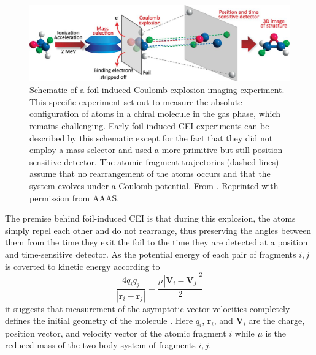 \begin{figure}[H]
  \centering
  \includegraphics[width=\textwidth]{gfx/FoilExperiment}
  \caption[Schematic of a foil-induced Coulomb explosion imaging experiment.]
  {Schematic of a foil-induced Coulomb explosion imaging experiment. This specific experiment set out to measure the absolute configuration of atoms in a chiral molecule in the gas phase, which remains challenging. Early foil-induced CEI experiments can be described by this schematic except for the fact that they did not employ a mass selector and used a more primitive but still position-sensitive detector. The atomic fragment trajectories (dashed lines) assume that no rearrangement of the atoms occurs and that the system evolves under a Coulomb potential. From \citet{Herwig13}. Reprinted with permission from AAAS.}
  \label{fig:foilExperiment}
\end{figure}

The premise behind foil-induced CEI is that during this explosion, the atoms simply repel each other and do not rearrange, thus preserving the angles between them from the time they exit the foil to the time they are detected at a position and time-sensitive detector. As the potential energy of each pair of fragments $i,j$ is coverted to kinetic energy according to
\begin{equation}\label{eq:foilCEI}
\frac{4q_i q_j}{|\mathbf{r}_i - \mathbf{r}_j|} = \frac{\mu|\mathbf{V}_i - \mathbf{V}_j|^2}{2}
\end{equation}
it suggests that measurement of the asymptotic vector velocities completely defines the initial geometry of the molecule \citep{Vager89}. Here $q_i$, $\mathbf{r}_i$, and $\mathbf{V}_i$ are the charge, position vector, and velocity vector of the atomic fragment $i$ while $\mu$ is the reduced mass of the two-body system of fragments $i,j$.

